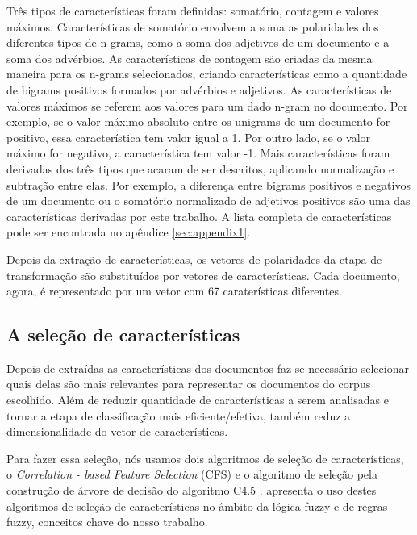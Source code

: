 Três tipos de características foram definidas: somatório, contagem e valores máximos. Características de somatório envolvem a soma as polaridades dos diferentes tipos de n-grams, como a soma dos adjetivos de um documento e a soma dos advérbios. As características de contagem são criadas da mesma maneira para os n-grams selecionados, criando características como a quantidade de bigrams positivos formados por advérbios e adjetivos. As características de valores máximos se referem aos valores para um dado n-gram no documento. Por exemplo, se o valor máximo absoluto entre os unigrams de um documento for positivo, essa característica tem valor igual a 1. Por outro lado, se o valor máximo for negativo, a característica tem valor -1. Mais características foram derivadas dos três tipos que acaram de ser descritos, aplicando normalização e subtração entre elas. Por exemplo, a diferença entre bigrams positivos e negativos de um documento ou o somatório normalizado de adjetivos positivos são uma das características derivadas por este trabalho. A lista completa de características pode ser encontrada no apêndice \ref{sec:appendix1}.

Depois da extração de características, os vetores de polaridades da etapa de transformação são substituídos por vetores de características. Cada documento, agora, é representado por um vetor com 67 caraterísticas diferentes. 

\subsection{A seleção de características}

Depois de extraídas as características dos documentos faz-se necessário selecionar quais delas são mais relevantes para representar os documentos do corpus escolhido. Além de reduzir quantidade de características a serem analisadas e tornar a etapa de classificação mais eficiente/efetiva, também reduz a dimensionalidade do vetor de características. 

Para fazer essa seleção, nós usamos dois algoritmos de seleção de características, o \textit{Correlation - based Feature Selection} (CFS) e o algoritmo de seleção pela construção de árvore de decisão do algoritmo C4.5 \cite{cintra2008fuzzy}.  apresenta o uso destes algoritmos de seleção de características no âmbito da lógica fuzzy e de regras fuzzy, conceitos chave do nosso trabalho. 

